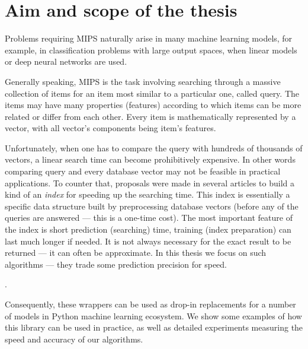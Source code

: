 \section{Aim and scope of the thesis}


Problems requiring MIPS naturally arise in many machine learning models, for example, in
classification problems with large output spaces, when linear models or deep neural networks are used.

Generally speaking, MIPS is the task involving searching through a massive collection of items for
an item most similar to a particular one, called query. The items may have many properties (features)
according to which items can be more related or differ from each other.
Every item is mathematically represented by a vector, with all vector's components being item's features.

Unfortunately, when one has to compare the query with hundreds of thousands of vectors,
a linear search time can become prohibitively expensive.
In other words comparing query and every database vector may not be feasible in practical applications.
To counter that, proposals were made in several articles to build a kind of an \textit{index} for speeding
up the searching time.
This index is essentially a specific data structure built by preprocessing database vectors (before
any of the queries are answered --- this is a one-time cost).
The most important feature of the index is short prediction (searching) time, training (index preparation)
can last much longer if needed.
It is not always necessary for the exact result to be returned --- it can often be approximate.
In this thesis we focus on such algorithms --- they trade some prediction precision for speed.

.

 Consequently,
these wrappers can be used as drop-in replacements for a number of models in Python machine learning ecosystem.
We show some examples of how this library can be used in practice,
as well as detailed experiments measuring the speed and accuracy of our algorithms.

